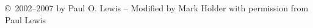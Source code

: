 \newcommand{\section}{\secdef \newsection\newsection}
\newcommand{\newsection}[1]{%
{
	\par\flushleft\large\sf\bfseries \vskip -2cm #1\\\rule[0.7\baselineskip]{\textwidth}{0.5mm}\par}}

\newcommand{\subsection}{\secdef \test\test}
\newcommand{\test}[1]{%
	{\par\flushleft\normalsize\sf\bfseries #1: }}
\newcommand{\M}{\mathcal{M}}
\newcommand{\prob}{{\rm Prob~}}
\def\showy#1{{\normalsize\sf\bfseries #1}}
\def\donotuse#1{}

\newcommand{\entrylabel}[1]{\mbox{#1}\hfil}
\newenvironment{entry}
	{\begin{list}{}%
		{\renewcommand{\makelabel}{\entrylabel}%
		\setlength{\labelwidth}{35pt}%
		\setlength{\leftmargin}{\labelwidth+\labelsep}%
	}%
	{\end{list}}}

\newcommand{\poltext}{{\copyright\ 2002--2007 by Paul O. Lewis -- Modified by  Mark Holder with permission from Paul Lewis}}

\newcommand{\pol}{{\footnotesize \poltext}}
\newcommand{\myBackground}{\begin{picture}(0,0)(0,0)  \put(-40,-70){\makebox(0,0)[l]{\texttt{[image: images/baby\_blue.jpg]}}} \end{picture}}
\newcommand{\myFooter}{}
\newcommand{\myNewSlide}{\newpage\myFooter} %
